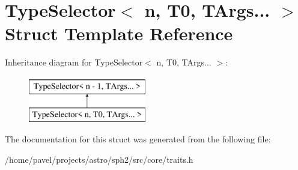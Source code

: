 \hypertarget{structTypeSelector_3_01n_00_01T0_00_01TArgs_8_8_8_01_4}{}\section{Type\+Selector$<$ n, T0, T\+Args... $>$ Struct Template Reference}
\label{structTypeSelector_3_01n_00_01T0_00_01TArgs_8_8_8_01_4}
Inheritance diagram for Type\+Selector$<$ n, T0, T\+Args... $>$\+:\begin{figure}[H]
\begin{center}
\leavevmode
\includegraphics[height=2.000000cm]{structTypeSelector_3_01n_00_01T0_00_01TArgs_8_8_8_01_4}
\end{center}
\end{figure}


The documentation for this struct was generated from the following file\+:\begin{DoxyCompactItemize}
\item 
/home/pavel/projects/astro/sph2/src/core/traits.\+h\end{DoxyCompactItemize}
